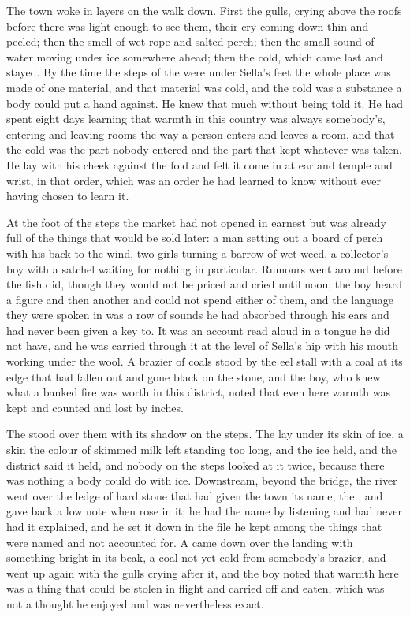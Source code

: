 The town woke in layers on the walk down. First the gulls, crying above the roofs before there was light enough to see them, their cry coming down thin and peeled; then the smell of wet rope and salted perch; then the small sound of water moving under ice somewhere ahead; then the cold, which came last and stayed. By the time the steps of the  were under Sella's feet the whole place was made of one material, and that material was cold, and the cold was a substance a body could put a hand against. He knew that much without being told it. He had spent eight days learning that warmth in this country was always somebody's, entering and leaving rooms the way a person enters and leaves a room, and that the cold was the part nobody entered and the part that kept whatever was taken. He lay with his cheek against the fold and felt it come in at ear and temple and wrist, in that order, which was an order he had learned to know without ever having chosen to learn it.

At the foot of the steps the market had not opened in earnest but was already full of the things that would be sold later: a man setting out a board of perch with his back to the wind, two girls turning a barrow of wet weed, a collector's boy with a satchel waiting for nothing in particular. Rumours went around before the fish did, though they would not be priced and cried until noon; the boy heard a figure and then another and could not spend either of them, and the language they were spoken in was a row of sounds he had absorbed through his ears and had never been given a key to. It was an account read aloud in a tongue he did not have, and he was carried through it at the level of Sella's hip with his mouth working under the wool. A brazier of coals stood by the eel stall with a coal at its edge that had fallen out and gone black on the stone, and the boy, who knew what a banked fire was worth in this district, noted that even here warmth was kept and counted and lost by inches.

The  stood over them with its shadow on the steps. The  lay under its skin of ice, a skin the colour of skimmed milk left standing too long, and the ice held, and the district said it held, and nobody on the steps looked at it twice, because there was nothing a body could do with ice. Downstream, beyond the bridge, the river went over the ledge of hard stone that had given the town its name, the , and gave back a low note when  rose in it; he had the name by listening and had never had it explained, and he set it down in the file he kept among the things that were named and not accounted for. A  came down over the landing with something bright in its beak, a coal not yet cold from somebody's brazier, and went up again with the gulls crying after it, and the boy noted that warmth here was a thing that could be stolen in flight and carried off and eaten, which was not a thought he enjoyed and was nevertheless exact.

